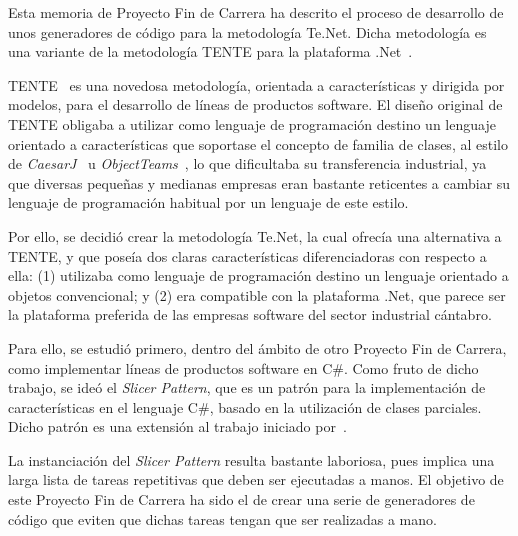 
Esta memoria de Proyecto Fin de Carrera ha descrito el proceso de desarrollo de unos generadores de código para la metodología Te.Net. Dicha metodología es una variante de la metodología TENTE para la plataforma .Net~\citep{}. 

TENTE~\citep{} es una novedosa metodología, orientada a características y dirigida por modelos, para el desarrollo de líneas de productos software. El diseño original de TENTE obligaba a utilizar como lenguaje de programación destino un lenguaje orientado a características que soportase el concepto de familia de clases, al estilo de \emph{CaesarJ}~\citep{} u \emph{ObjectTeams}~\citep{}, lo que dificultaba su transferencia industrial, ya que diversas pequeñas y medianas empresas eran bastante reticentes a cambiar su lenguaje de programación habitual por un lenguaje de este estilo. 

Por ello, se decidió crear la metodología Te.Net, la cual ofrecía una alternativa a TENTE, y que poseía dos claras características diferenciadoras con respecto a ella: (1) utilizaba como lenguaje de programación destino un lenguaje orientado a objetos convencional; y (2) era compatible con la plataforma .Net, que parece ser la plataforma preferida de las empresas software del sector industrial cántabro. 

Para ello, se estudió primero, dentro del ámbito de otro Proyecto Fin de Carrera, como implementar líneas de productos software en C\#. Como fruto de dicho trabajo, se ideó el \emph{Slicer Pattern}, que es un patrón para la implementación de características en el lenguaje C\#, basado en la utilización de clases parciales. Dicho patrón es una extensión al trabajo iniciado por~\citep{laguna:2010}.

La instanciación del \emph{Slicer Pattern} resulta bastante laboriosa, pues implica una larga lista de tareas repetitivas que deben ser ejecutadas a manos. El objetivo de este Proyecto Fin de Carrera ha sido el de crear una serie de generadores de código que eviten que dichas tareas tengan que ser realizadas a mano. 

